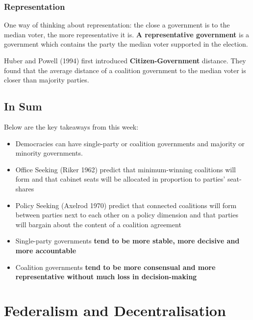 \documentclass[12pt, letterpaper]{article}
\begin{document}
\subsubsection{Representation}
One way of thinking about representation: the close a government is to the median voter, the more representative it is. \textbf{A representative government} is a government which contains the party the median voter supported in the election.

Huber and Powell (1994) first introduced \textbf{Citizen-Government} distance. They found that the average distance of a coalition government to the median voter is closer than majority parties.

\subsection{In Sum}
Below are the key takeaways from this week:
\begin{itemize}
	\item Democracies can have single-party or coalition governments and majority or minority governments.
	\item Office Seeking (Riker 1962) predict that minimum-winning coalitions will form and that cabinet seats will be allocated in proportion to parties' seat-shares
	\item Policy Seeking (Axelrod 1970) predict that connected coalitions will form between parties next to each other on a policy dimension and that parties will bargain about the content of a coalition agreement
	\item Single-party governments \textbf{tend to be more stable, more decisive and more accountable}
	\item Coalition governments \textbf{tend to be more consensual and more representative without much loss in decision-making}
\end{itemize}

\newpage
\section{Federalism and Decentralisation}
\end{document}
